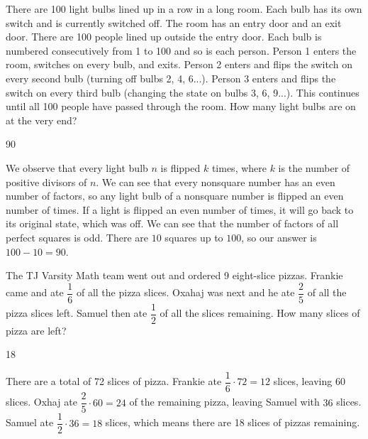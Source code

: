\documentclass[11pt]{article}
\begin{document}
\begin{problem}
There are 100 light bulbs lined up in a row in a long room. Each bulb has its own switch and is currently switched off. The room has an entry door and an exit door. There are 100 people lined up outside the entry door. Each bulb is numbered consecutively from 1 to 100 and so is each person. Person 1 enters the room, switches on every bulb, and exits. Person 2 enters and flips the switch on every second bulb (turning off bulbs 2, 4, 6...). Person 3 enters and flips the switch on every third bulb (changing the state on bulbs 3, 6, 9...). This continues until all 100 people have passed through the room. How many light bulbs are on at the very end?
\end{problem}

\begin{answer}
90
\end{answer}

\begin{solution} %
We observe that every light bulb $n$ is flipped $k$ times, where $k$ is the number of positive divisors of $n$. We can see that every nonsquare number has an even number of factors, so any light bulb of a nonsquare number is flipped an even number of times. If a light is flipped an even number of times, it will go back to its original state, which was off. We can see that the number of factors of all perfect squares is odd. There are $10$ squares up to $100$, so our answer is $100 - 10 = 90$.
\end{solution}


\begin{problem} %
The TJ Varsity Math team went out and ordered 9 eight-slice pizzas. Frankie came and ate $\dfrac{1}{6}$ of all the pizza slices. Oxahaj was next and he ate $\dfrac{2}{5}$ of all the pizza slices left. Samuel then ate $\dfrac{1}{2}$ of all the slices remaining. How many slices of pizza are left?
\end{problem}

\begin{answer}
18
\end{answer}

\begin{solution} %
There are a total of 72 slices of pizza. Frankie ate $\dfrac{1}{6} \cdot 72 = 12$ slices, leaving 60 slices. Oxhaj ate $\dfrac{2}{5} \cdot 60 = 24$ of the remaining pizza, leaving Samuel with $36$ slices. Samuel ate $\dfrac{1}{2} \cdot 36 = 18$ slices, which means there are 18 slices of pizzas remaining. 
\end{solution}
\end{document}
